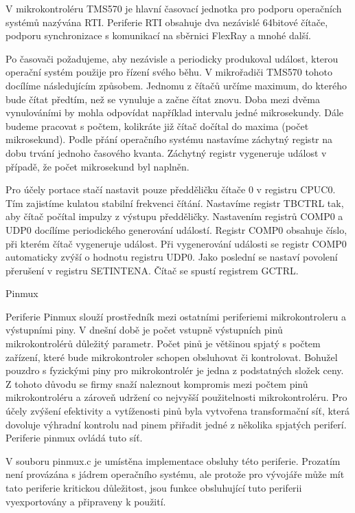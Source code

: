 V mikrokontroléru TMS570 je hlavní časovací jednotka pro podporu operačních systémů nazývána RTI. Periferie RTI obsahuje dva nezávislé 64bitové čítače, podporu synchronizace s komunikací na sběrnici FlexRay a mnohé další.

Po časovači požadujeme, aby nezávisle a periodicky produkoval událost, kterou operační systém použije pro řízení svého běhu. V mikrořadiči TMS570 tohoto docílíme následujícím způsobem. Jednomu z čítačů určíme maximum, do kterého bude čítat předtím, než se vynuluje a začne čítat znovu. Doba mezi dvěma vynulováními by mohla odpovídat například intervalu jedné mikrosekundy. Dále budeme pracovat s počtem, kolikráte již čítač dočítal do maxima (počet mikrosekund). Podle přání operačního systému nastavíme záchytný registr na dobu trvání jednoho časového kvanta. Záchytný registr vygeneruje událost v případě, že počet mikrosekund byl naplněn.

Pro účely portace stačí nastavit pouze předděličku čítače 0 v registru CPUC0. Tím zajistíme kulatou stabilní frekvenci čítání. Nastavíme registr TBCTRL tak, aby čítač počítal impulzy z výstupu předděličky. Nastavením registrů COMP0 a UDP0 docílíme periodického generování událostí. Registr COMP0 obsahuje číslo, při kterém čítač vygeneruje událost. Při vygenerování události se registr COMP0 automaticky zvýší o hodnotu registru UDP0. Jako poslední se nastaví povolení přerušení v registru SETINTENA. Čítač se spustí registrem GCTRL.

\secc    Pinmux

Periferie Pinmux slouží prostředník mezi ostatními periferiemi mikrokontroleru a výstupními piny. V dnešní době je počet vstupně výstupních pinů mikrokontrolérů důležitý parametr. Počet pinů je většinou spjatý s počtem zařízení, které bude mikrokontroler schopen obsluhovat či kontrolovat. Bohužel pouzdro s fyzickými piny pro mikrokontrolér je jedna z podstatných složek ceny. Z tohoto důvodu se firmy snaží naleznout kompromis mezi počtem pinů mikrokontroléru a zároveň udržení co nejvyšší použitelnosti mikrokontroléru. Pro účely zvýšení efektivity a vytíženosti pinů byla vytvořena transformační síť, která dovoluje výhradní kontrolu nad pinem přiřadit jedné z několika spjatých periferí. Periferie pinmux ovládá tuto síť.

V souboru pinmux.c je umístěna implementace obsluhy této periferie. Prozatím není provázána s jádrem operačního systému, ale protože pro vývojáře může mít tato periferie kritickou důležitost, jsou funkce obsluhující tuto periferii vyexportovány a připraveny k použití.

